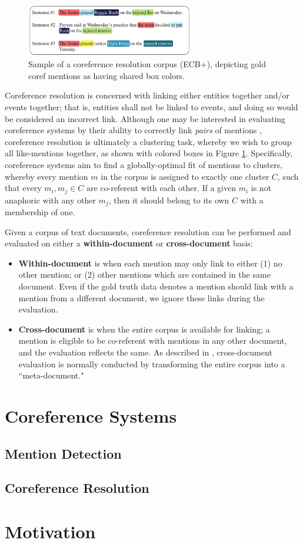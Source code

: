 \begin{figure}[ht]
\centering
	\includegraphics[width=0.65\textwidth]{graphics/corpus}
	\caption{Sample of a coreference resolution corpus (ECB+), depicting gold coref mentions as having shared box colors.}
	\label{fig:corpus}
\end{figure}

Coreference resolution is concerned with linking either entities together and/or events together; that is, entities shall not be linked to events, and doing so would be considered an incorrect link.  Although one may be interested in evaluating coreference systems by their ability to correctly link \textit{pairs} of mentions \cite{parma}, coreference resolution is ultimately a clustering task, whereby we wish to group all like-mentions together, as shown with colored boxes in Figure \ref{fig:corpus}.  Specifically, coreference systems aim to find a globally-optimal fit of mentions to clusters, whereby every mention $m$ in the corpus is assigned to exactly one cluster $C$, such that every ${m_i,m_j} \in C$ are co-referent with each other.  If a given $m_i$ is not anaphoric with any other $m_j$, then it should belong to its own $C$ with a membership of one.

Given a corpus of text documents, coreference resolution can be performed and evaluated on either a \textbf{within-document} or \textbf{cross-document} basis:

\begin{itemize}
\item \textbf{Within-document} is when each mention may only link to either (1) no other mention; or (2) other mentions which are contained in the same document.  Even if the gold truth data denotes a mention should link with a mention from a different document, we ignore these links during the evaluation.
\item \textbf{Cross-document} is when the entire corpus is available for linking; a mention is eligible to be co-referent with mentions in any other document, and the evaluation reflects the same.  As described in \cite{revisit:16}, cross-document evaluation is normally conducted by transforming the entire corpus into a ``meta-document."
\end{itemize}

\section{Coreference Systems}

\subsection{Mention Detection}
\subsection{Coreference Resolution}
\section{Motivation}



